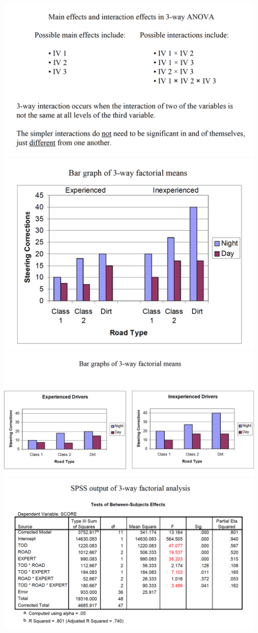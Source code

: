 \documentclass[]{book}
\theoremstyle{definition}
\theoremstyle{definition}
\theoremstyle{definition}
\theoremstyle{remark}
\begin{document}
\includegraphics{img/hicksfa29.png} \includegraphics{img/hicksfa30.png}
\includegraphics{img/hicksfa31.png} \includegraphics{img/hicksfa32.png}
\end{document}
